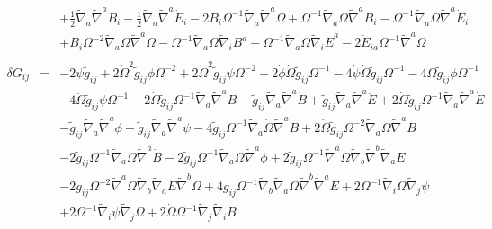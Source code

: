 \documentclass[10pt,letterpaper]{article}
\numberwithin{equation}{section}
\begin{document}
\begin{eqnarray}
&&
+ \tfrac{1}{2} \tilde{\nabla}_{a}\tilde{\nabla}^{a}B_{i}
-  \tfrac{1}{2} \tilde{\nabla}_{a}\tilde{\nabla}^{a}\dot{E}_{i}
- 2 B_{i} \Omega^{-1} \tilde{\nabla}_{a}\tilde{\nabla}^{a}\Omega
+ \Omega^{-1} \tilde{\nabla}_{a}\Omega \tilde{\nabla}^{a}B_{i}
-  \Omega^{-1} \tilde{\nabla}_{a}\Omega \tilde{\nabla}^{a}\dot{E}_{i}
\nonumber\\
&&
+ B_{i} \Omega^{-2} \tilde{\nabla}_{a}\Omega \tilde{\nabla}^{a}\Omega
-  \Omega^{-1} \tilde{\nabla}_{a}\Omega \tilde{\nabla}_{i}B^{a}
-  \Omega^{-1} \tilde{\nabla}_{a}\Omega \tilde{\nabla}_{i}\dot{E}^{a}
-2 \dot{E}_{ia} \Omega^{-1} \tilde{\nabla}^{a}\Omega
%
%
\\ \nonumber\\
\delta G_{ij} &=&
-2 \ddot{\psi} \tilde{g}_{ij}
+ 2 \dot{\Omega}^2 \tilde{g}_{ij} \phi \Omega^{-2}
+ 2 \dot{\Omega}^2 \tilde{g}_{ij} \psi \Omega^{-2}
- 2 \dot{\phi} \dot{\Omega} \tilde{g}_{ij} \Omega^{-1}
- 4 \dot{\psi} \dot{\Omega} \tilde{g}_{ij} \Omega^{-1}
- 4 \ddot{\Omega} \tilde{g}_{ij} \phi \Omega^{-1}\nonumber\\
&& - 4 \ddot{\Omega} \tilde{g}_{ij} \psi \Omega^{-1}
- 2 \dot{\Omega} \tilde{g}_{ij} \Omega^{-1} \tilde{\nabla}_{a}\tilde{\nabla}^{a}B
-  \tilde{g}_{ij} \tilde{\nabla}_{a}\tilde{\nabla}^{a}\dot{B}
+ \tilde{g}_{ij} \tilde{\nabla}_{a}\tilde{\nabla}^{a}\ddot{E}
+ 2 \dot{\Omega} \tilde{g}_{ij} \Omega^{-1} \tilde{\nabla}_{a}\tilde{\nabla}^{a}\dot{E}\nonumber\\
&& -  \tilde{g}_{ij} \tilde{\nabla}_{a}\tilde{\nabla}^{a}\phi
+ \tilde{g}_{ij} \tilde{\nabla}_{a}\tilde{\nabla}^{a}\psi
- 4 \tilde{g}_{ij} \Omega^{-1} \tilde{\nabla}_{a}\dot{\Omega} \tilde{\nabla}^{a}B
+ 2 \dot{\Omega} \tilde{g}_{ij} \Omega^{-2} \tilde{\nabla}_{a}\Omega \tilde{\nabla}^{a}B\nonumber\\
&& - 2 \tilde{g}_{ij} \Omega^{-1} \tilde{\nabla}_{a}\Omega \tilde{\nabla}^{a}\dot{B}
- 2 \tilde{g}_{ij} \Omega^{-1} \tilde{\nabla}_{a}\Omega \tilde{\nabla}^{a}\phi
+ 2 \tilde{g}_{ij} \Omega^{-1} \tilde{\nabla}^{a}\Omega \tilde{\nabla}_{b}\tilde{\nabla}^{b}\tilde{\nabla}_{a}E\nonumber\\
&& - 2 \tilde{g}_{ij} \Omega^{-2} \tilde{\nabla}^{a}\Omega \tilde{\nabla}_{b}\tilde{\nabla}_{a}E \tilde{\nabla}^{b}\Omega
+ 4 \tilde{g}_{ij} \Omega^{-1} \tilde{\nabla}_{b}\tilde{\nabla}_{a}\Omega \tilde{\nabla}^{b}\tilde{\nabla}^{a}E
+ 2 \Omega^{-1} \tilde{\nabla}_{i}\Omega \tilde{\nabla}_{j}\psi\nonumber\\
&& + 2 \Omega^{-1} \tilde{\nabla}_{i}\psi \tilde{\nabla}_{j}\Omega
+ 2 \dot{\Omega} \Omega^{-1} \tilde{\nabla}_{j}\tilde{\nabla}_{i}B

\end{eqnarray}
\end{document}
